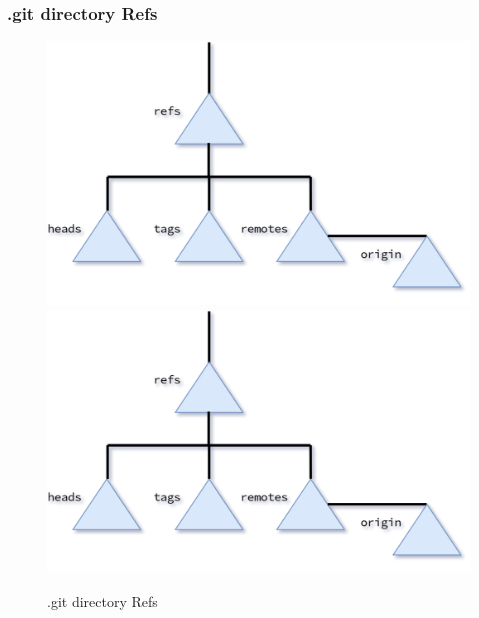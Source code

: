 \begin{frame}
    \frametitle{.git directory Refs}
    \addtocounter{page}{-1}
    \begin{figure}
        \begin{center}
            {
                \includegraphics[height=0.75\textheight,keepaspectratio]{./images/gitDirectory-Refs.png}
            }
            {
                \includegraphics[height=0.75\textheight,keepaspectratio]{./images/gitDirectory-Refs.png}
            }
            \caption{.git directory Refs}
        \end{center}
    \end{figure}
\end{frame}

